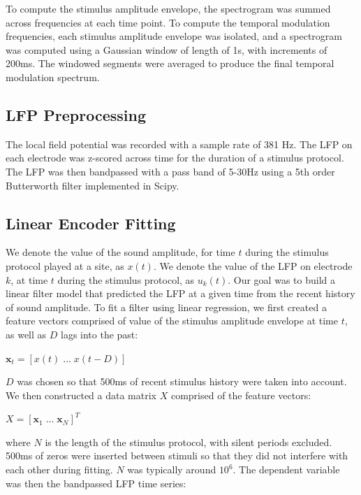 To compute the stimulus amplitude envelope, the spectrogram was summed across frequencies at each time point. To compute the temporal modulation frequencies, each stimulus amplitude envelope was isolated, and a spectrogram was computed using a Gaussian window of length of 1s, with increments of 200ms. The windowed segments were averaged to produce the final temporal modulation spectrum.

\subsection{LFP Preprocessing}

The local field potential was recorded with a sample rate of 381 Hz. The LFP on each electrode was z-scored across time for the duration of a stimulus protocol. The LFP was then bandpassed with a pass band of 5-30Hz using a 5th order Butterworth filter implemented in Scipy.

\subsection{Linear Encoder Fitting}

We denote the value of the sound amplitude, for time $t$ during the stimulus protocol played at a site, as $x(t)$. We denote the value of the LFP on electrode $k$, at time $t$ during the stimulus protocol, as $u_k (t)$. Our goal was to build a linear filter model that predicted the LFP at a given time from the recent history of sound amplitude. To fit a filter using linear regression, we first created a feature vectors comprised of value of the stimulus amplitude envelope at time $t$, as well as $D$ lags into the past:

\begin{center}
$\textbf{x}_t = [x(t) \; ... \; x(t-D)]$
\end{center}

$D$ was chosen so that 500ms of recent stimulus history were taken into account. We then constructed a data matrix $X$ comprised of the feature vectors:

\begin{center}
$X = [\textbf{x}_1 \; ... \; \textbf{x}_{N}]^T$
\end{center}

where $N$ is the length of the stimulus protocol, with silent periods excluded. 500ms of zeros were inserted between stimuli so that they did not interfere with each other during fitting. $N$ was typically around $10^6$. The dependent variable was then the bandpassed LFP time series:

